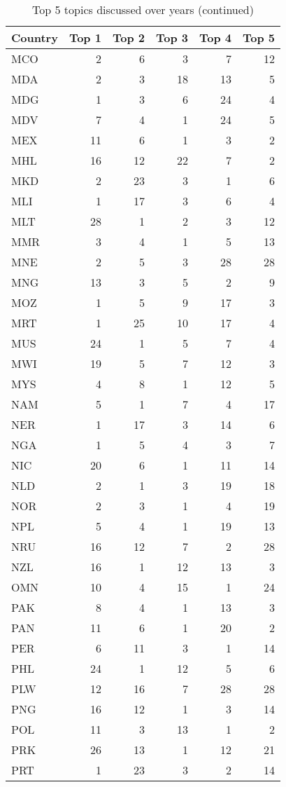     
    
    \begin{table}
    \centering
    \caption{Top 5 topics discussed over years (continued)}
    \label{tab:top 5 topics all4}
    \begin{tabular}{lrrrrr}
    \toprule
    Country &     Top 1 &     Top 2 &     Top 3 &     Top 4 &     Top 5 \\
    \midrule
    MCO  & 2 & 6 & 3 & 7 & 12\\
    MDA  & 2 & 3 & 18 & 13 & 5\\
    MDG  & 1 & 3 & 6 & 24 & 4\\
    MDV  & 7 & 4 & 1 & 24 & 5\\
    MEX  & 11 & 6 & 1 & 3 & 2\\
    MHL  & 16 & 12 & 22 & 7 & 2\\
    MKD  & 2 & 23 & 3 & 1 & 6\\
    MLI  & 1 & 17 & 3 & 6 & 4\\
    MLT  & 28 & 1 & 2 & 3 & 12\\
    MMR  & 3 & 4 & 1 & 5 & 13\\
    MNE  & 2 & 5 & 3 & 28 & 28\\
    MNG  & 13 & 3 & 5 & 2 & 9\\
    MOZ  & 1 & 5 & 9 & 17 & 3\\
    MRT  & 1 & 25 & 10 & 17 & 4\\
    MUS  & 24 & 1 & 5 & 7 & 4\\
    MWI  & 19 & 5 & 7 & 12 & 3\\
    MYS  & 4 & 8 & 1 & 12 & 5\\
    NAM  & 5 & 1 & 7 & 4 & 17\\
    NER  & 1 & 17 & 3 & 14 & 6\\
    NGA  & 1 & 5 & 4 & 3 & 7\\
    NIC  & 20 & 6 & 1 & 11 & 14\\
    NLD  & 2 & 1 & 3 & 19 & 18\\
    NOR  & 2 & 3 & 1 & 4 & 19\\
    NPL  & 5 & 4 & 1 & 19 & 13\\
    NRU  & 16 & 12 & 7 & 2 & 28\\
    NZL  & 16 & 1 & 12 & 13 & 3\\
    OMN  & 10 & 4 & 15 & 1 & 24\\
    PAK  & 8 & 4 & 1 & 13 & 3\\
    PAN  & 11 & 6 & 1 & 20 & 2\\
    PER  & 6 & 11 & 3 & 1 & 14\\
    PHL  & 24 & 1 & 12 & 5 & 6\\
    PLW  & 12 & 16 & 7 & 28 & 28\\
    PNG  & 16 & 12 & 1 & 3 & 14\\
    POL  & 11 & 3 & 13 & 1 & 2\\
    PRK  & 26 & 13 & 1 & 12 & 21\\
    PRT  & 1 & 23 & 3 & 2 & 14\\
    \bottomrule
    \end{tabular}\end{table}
    
